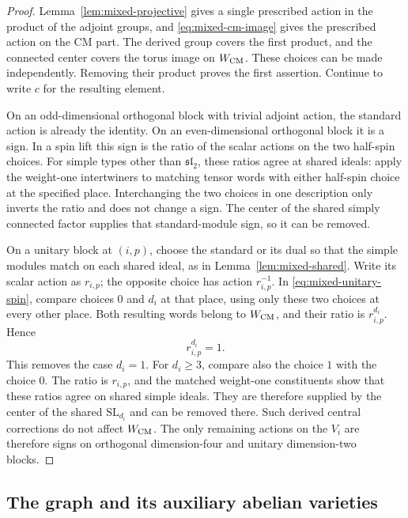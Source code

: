 \begin{proof}
Lemma~\ref{lem:mixed-projective} gives a single prescribed action
in the product of the adjoint groups, and
\eqref{eq:mixed-cm-image} gives the prescribed action on the CM
part.  The derived group covers the first product, and the connected
center covers the torus image on $W_{\rm CM}$.  These choices can
be made independently.  Removing their product proves the first
assertion.  Continue to write $c$ for the resulting element.

On an odd-dimensional orthogonal block with trivial adjoint action,
the standard action is already the identity.  On an even-dimensional
orthogonal block it is a sign.  In a spin lift this sign is the ratio
of the scalar actions on the two half-spin choices.  For simple
types other than $\mathfrak{sl}_2$, these ratios agree at shared
ideals: apply the weight-one intertwiners to matching tensor words
with either half-spin choice at the specified place.  Interchanging
the two choices in one description only inverts the ratio and does
not change a sign.  The center of the shared simply connected
factor supplies that standard-module sign, so it can be removed.

On a unitary block at $(i,p)$, choose the standard or its dual so
that the simple modules match on each shared ideal, as in
Lemma~\ref{lem:mixed-shared}.  Write its scalar action as $r_{i,p}$;
the opposite choice has action $r_{i,p}^{-1}$.  In
\eqref{eq:mixed-unitary-spin}, compare choices $0$ and $d_i$ at
that place, using only these two choices at every other place.
Both resulting words belong to $W_{\rm CM}$, and their ratio is
$r_{i,p}^{d_i}$.  Hence
\begin{equation}\label{eq:mixed-unitary-root}
 r_{i,p}^{d_i}=1.
\end{equation}
This removes the case $d_i=1$.  For $d_i\ge3$, compare also the
choice $1$ with the choice $0$.  The ratio is $r_{i,p}$, and the
matched weight-one constituents show that these ratios agree on
shared simple ideals.  They are therefore supplied by the center
of the shared $\mathrm{SL}_{d_i}$ and can be removed there.
Such derived central corrections do not affect $W_{\rm CM}$.
The only remaining actions on the $V_i$ are therefore signs on
orthogonal dimension-four and unitary dimension-two blocks.
\end{proof}

\subsection{The graph and its auxiliary abelian varieties}

